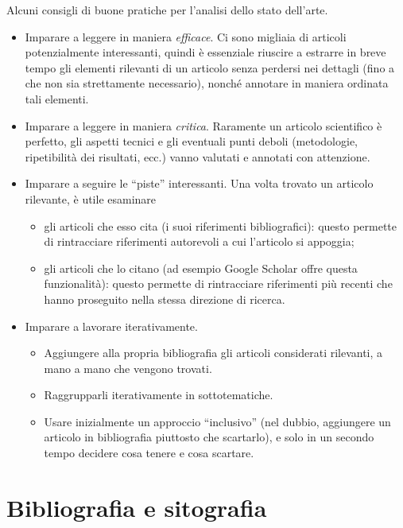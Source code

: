 \documentclass[12pt]{report}
\begin{document}
    Alcuni consigli di buone pratiche per l'analisi dello stato dell'arte.
    \begin{itemize}
        \item Imparare a leggere in maniera {\em efficace}. Ci sono migliaia di articoli potenzialmente interessanti, quindi \`e essenziale riuscire a estrarre in breve tempo gli elementi rilevanti di un articolo senza perdersi nei dettagli (fino a che non sia strettamente necessario), nonch\'e annotare in maniera ordinata tali elementi.
        \item Imparare a leggere in maniera {\em critica}. Raramente un articolo scientifico \`e perfetto, gli aspetti tecnici e gli eventuali punti deboli (metodologie, ripetibilit\`a dei risultati, ecc.) vanno valutati e annotati con attenzione.
        \item Imparare a seguire le ``piste'' interessanti. Una volta trovato un articolo rilevante, \`e utile esaminare
        \begin{itemize}
            \item gli articoli che esso cita (i suoi riferimenti bibliografici): questo permette di rintracciare riferimenti autorevoli a cui l'articolo si appoggia;
            \item gli articoli che lo citano (ad esempio Google Scholar offre questa funzionalit\`a): questo permette di rintracciare riferimenti pi\`u recenti che hanno proseguito nella stessa direzione di ricerca.
        \end{itemize}
        \item Imparare a lavorare iterativamente.
        \begin{itemize}
            \item Aggiungere alla propria bibliografia gli articoli considerati rilevanti, a mano a mano che vengono trovati.
            \item Raggrupparli iterativamente in sottotematiche.
            \item Usare inizialmente un approccio ``inclusivo'' (nel dubbio, aggiungere un articolo in bibliografia piuttosto che scartarlo), e solo in un secondo tempo decidere cosa tenere e cosa scartare.
        \end{itemize}
    \end{itemize}



    \section{Bibliografia e sitografia}
    \label{sec:biblio}
\end{document}
